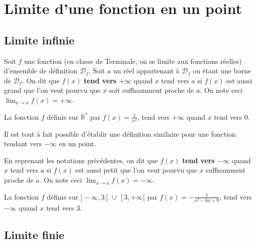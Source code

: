 



	\section{Limite d'une fonction en un point}

	\subsection{Limite infinie}

	\begin{formula}
		Soit $f$ une fonction (en classe de Terminale, on se limite aux fonctions réelles) d'ensemble de définition $\mathcal{D}_f$. Soit $a$ un réel appartenant à $\mathcal{D}_f$ ou étant une borne de $\mathcal{D}_f$.
		\newpar
		On dit que $f(x)$ \textbf{tend vers $+\infty$} quand $x$ tend vers $a$ si $f(x)$ est aussi grand que l'on veut pourvu que $x$ soit suffisamment proche de $a$.
		\newpar
		On note ceci $\lim_{x \rightarrow a} f(x) = +\infty$.
	\end{formula}

	\begin{tip}[Exemple]
		La fonction $f$ définie sur $\mathbb{R}^*$ par $f(x) = \frac{1}{x^2}$, tend vers $+\infty$ quand $x$ tend vers $0$.
	\end{tip}

	Il est tout à fait possible d'établir une définition similaire pour une fonction tendant vers $-\infty$ en un point.

	\begin{tip}
		En reprenant les notations précédentes, on dit que $f(x)$ \textbf{tend vers $-\infty$} quand $x$ tend vers $a$ si $f(x)$ est aussi petit que l'on veut pourvu que $x$ suffisamment proche de $a$.
		\newpar
		On note ceci $\lim_{x \rightarrow a} f(x) = -\infty$.
	\end{tip}

	\begin{tip}[Exemple]
		La fonction $f$ définie sur $]-\infty, 3[ \, \cup \, ]3, +\infty[$ par $f(x) = -\frac{1}{x^2-6x+9}$, tend vers $-\infty$ quand $x$ tend vers $3$.
	\end{tip}

	\subsection{Limite finie}

